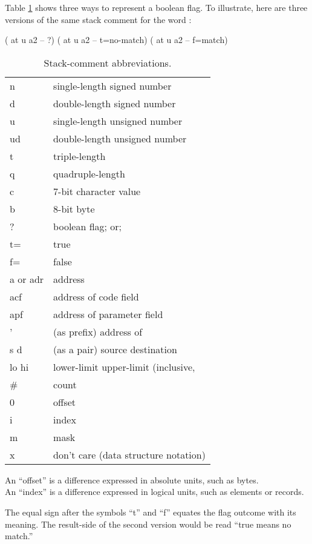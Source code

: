 Table \ref{tab-5-2} shows three ways to represent a boolean flag.  To
illustrate, here are three versions of the same stack comment for the
word :
\begin{Code}
( at u a2 -- ?)
( at u a2 -- t=no-match)
( at u a2 -- f=match)
\end{Code}
\begin{table}[hhhh]
\caption{Stack-comment abbreviations.}
\label{tab-5-2}
\vspace{1ex}
\blackline{1ex}
\begin{tabular}{@{\hspace{2.5em}}ll}
n             &  single-length signed number \\
d             &  double-length signed number \\
u             &  single-length unsigned number \\
ud            &  double-length unsigned number \\
t             &  triple-length \\
q             &  quadruple-length \\
c             &  7-bit character value \\
b             &  8-bit byte \\
?             &  boolean flag; or; \\
\quad t=         &  true \\
\quad f=         &  false \\
a or adr      &  address \\
acf           &  address of code field \\
apf           &  address of parameter field \\
'             &  (as prefix) address of \\
s d           &  (as a pair) source destination \\
lo hi         &  lower-limit upper-limit (inclusive, \\
\#            &   count \\
0             &  offset \\
i             &  index \\
m             &  mask \\
x             &  don't care (data structure notation) \\
\end{tabular}
\smallskip

An ``offset'' is a difference expressed in absolute units, such as bytes.\\
An ``index'' is a difference expressed in logical units, such as
elements or records.
\vspace{0ex}
\blackline{0ex}
\end{table}
The equal sign after the symbols ``t'' and ``f'' equates the flag
outcome with its meaning.  The result-side of the second version would
be read ``true means no match.''

